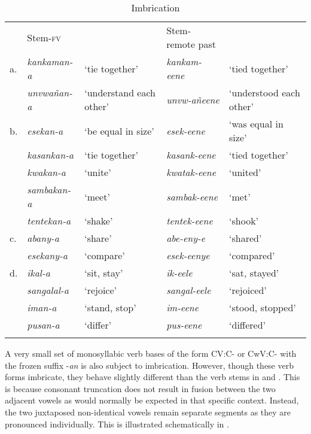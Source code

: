 \documentclass[output=paper]{langsci/langscibook}
\begin{document}
\begin{table}
\begin{tabular}{lllll}
\lsptoprule
 & Stem-\textsc{fv} &  & Stem-remote past & \\
a. & \textit{kankaman-a} & `tie together' & \textit{kankam-eene} & `tied together' \\
 & \textit{unvwañan-a} & `understand each other' & \textit{unvw-añeene} & `understood each other' \\

b. & \textit{esekan-a} & `be equal in size' & \textit{esek-eene} & `was equal in size' \\
 & \textit{kasankan-a} & `tie together' & \textit{kasank-eene} & `tied together' \\
 & \textit{kwakan-a} & `unite' & \textit{kwatak-eene} & `united' \\
 & \textit{sambakan-a} & `meet' & \textit{sambak-eene} & `met' \\
 & \textit{tentekan-a} & `shake' & \textit{tentek-eene} & `shook' \\

c. & \textit{abany-a} & `share' & \textit{abe-eny-e} & `shared' \\
 & \textit{esekany-a} & `compare' & \textit{esek-eenye} & `compared' \\

d. & \textit{ikal-a} & `sit, stay' & \textit{ik-eele} & `sat, stayed' \\
 & \textit{sangalal-a} & `rejoice' & \textit{sangal-eele} & `rejoiced' \\
 & \textit{iman-a} & `stand, stop' & \textit{im-eene} & `stood, stopped' \\
 & \textit{pusan-a} & `differ' & \textit{pus-eene} & `differed' \\

\lspbottomrule
\end{tabular}

\caption{Imbrication}
\label{tab:20.kawasha}

\end{table}


A very small set of monosyllabic verb bases of the form CV:C- or CwV:C- with the frozen suffix -\textit{an} is also subject to imbrication. However, though these verb forms imbricate, they behave slightly different than the verb stems in  and . This is because consonant truncation does not result in fusion between the two adjacent vowels as would normally be expected in that specific context. Instead, the two juxtaposed non-identical vowels remain separate segments as they are pronounced individually. This is illustrated schematically in . 
\end{document}
